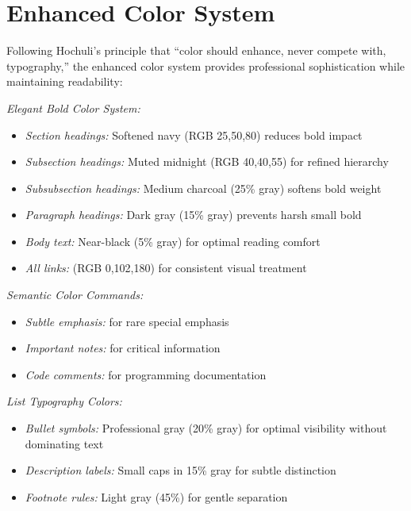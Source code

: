 \documentclass[11pt]{article}
\begin{document}
\section{Enhanced Color System}

Following Hochuli's principle that \enquote{color should enhance, never compete with, typography,} the enhanced color system provides professional sophistication while maintaining readability:

\emph{Elegant Bold Color System:}
\begin{itemize}
\item \emph{Section headings:} \textcolor{sectioncolor}{Softened navy} (RGB 25,50,80) reduces bold impact
\item \emph{Subsection headings:} \textcolor{subsectioncolor}{Muted midnight} (RGB 40,40,55) for refined hierarchy
\item \emph{Subsubsection headings:} \textcolor{subsubcolor}{Medium charcoal} (25\% gray) softens bold weight
\item \emph{Paragraph headings:} \textcolor{paragraphcolor}{Dark gray} (15\% gray) prevents harsh small bold
\item \emph{Body text:} \textcolor{textblack}{Near-black (5\% gray)} for optimal reading comfort
\item \emph{All links:}  (RGB 0,102,180) for consistent visual treatment
\end{itemize}

\emph{Semantic Color Commands:}
\begin{itemize}
\item \emph{Subtle emphasis:}  for rare special emphasis
\item \emph{Important notes:}  for critical information
\item \emph{Code comments:}  for programming documentation
\end{itemize}

\emph{List Typography Colors:}
\begin{itemize}
\item \emph{Bullet symbols:} Professional gray (20\% gray) for optimal visibility without dominating text
\item \emph{Description labels:} Small caps in 15\% gray for subtle distinction
\item \emph{Footnote rules:} Light gray (45\%) for gentle separation
\end{itemize}
\end{document}

